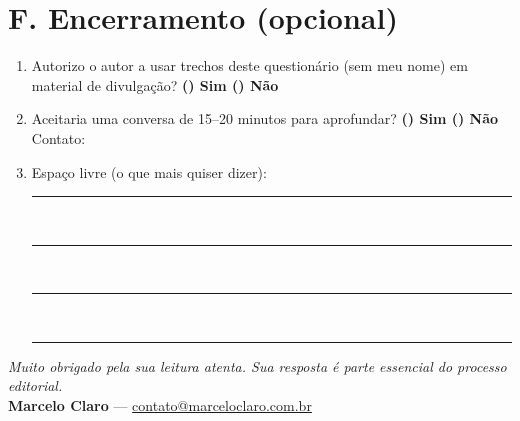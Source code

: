 \documentclass[11pt,a4paper]{article}
\newcommand{\resp}[1]{\vspace{2pt}\textbf{#1}\vspace{4pt}}
\begin{document}
\section*{F. Encerramento (opcional)}
\begin{enumerate}[label=F\arabic*]
\item Autorizo o autor a usar trechos deste questionário (sem meu nome) em material de divulgação?
  \hfill \resp{() Sim \quad () Não}
\item Aceitaria uma conversa de 15--20 minutos para aprofundar? \quad \resp{() Sim \quad () Não}
  \quad Contato: \dotfill
\item Espaço livre (o que mais quiser dizer):\\[6pt]
  \rule{\textwidth}{0.3pt}\\[2pt]
  \rule{\textwidth}{0.3pt}\\[2pt]
  \rule{\textwidth}{0.3pt}\\[2pt]
  \rule{\textwidth}{0.3pt}
\end{enumerate}

\vspace{12pt}
\begin{center}
\emph{Muito obrigado pela sua leitura atenta. Sua resposta é parte essencial do processo editorial.}\\[4pt]
\textbf{Marcelo Claro} — \href{mailto:contato@marceloclaro.com.br}{contato@marceloclaro.com.br}
\end{center}
\end{document}
